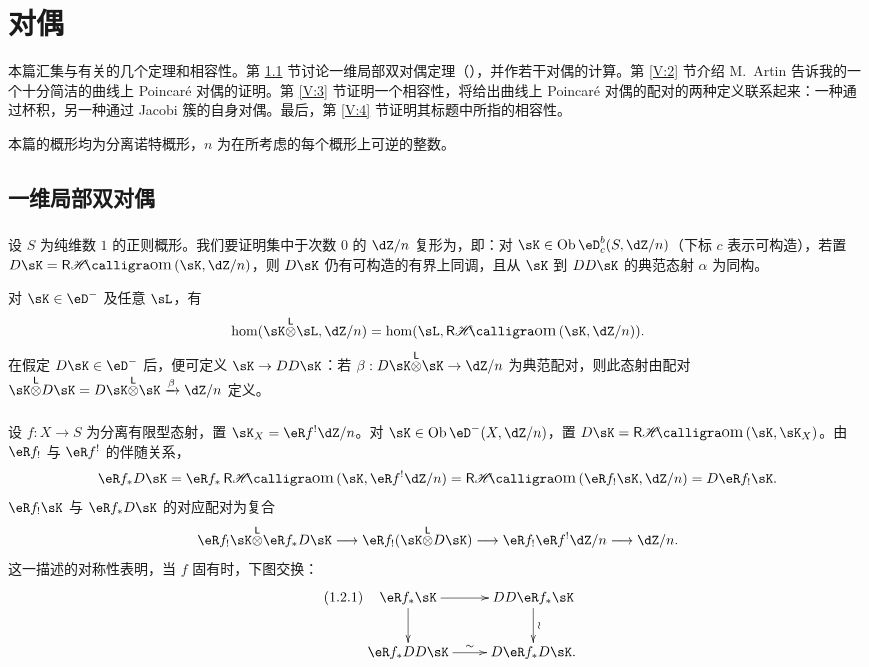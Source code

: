 \chapter{对偶}\label{V}
本篇汇集与有关的几个定理和相容性。第 \ref{V:1} 节讨论一维局部双对偶定理（\cite[I 5.1]{sga5}），并作若干对偶的计算。第 \ref{V:2} 节介绍 M.\ Artin 告诉我的一个十分简洁的曲线上 Poincaré 对偶的证明。第 \ref{V:3} 节证明一个相容性，将给出曲线上 Poincaré 对偶的配对的两种定义联系起来：一种通过杯积，另一种通过 Jacobi 簇的自身对偶。最后，第 \ref{V:4} 节证明其标题中所指的相容性。

本篇的概形均为分离诺特概形，$n$ 为在所考虑的每个概形上可逆的整数。

\section{一维局部双对偶}\label{V:1}
\subsection{}\label{V:1-1}
设 $S$ 为纯维数 $1$ 的正则概形。我们要证明集中于次数 $0$ 的 $\dZ/n$ 复形为，即：对 $\sK\in\ob\eD_c^b(S,\dZ/n)$（下标 $c$ 表示可构造），若置 $D\sK=\rHom(\sK,\dZ/n)$，则 $D\sK$ 仍有可构造的有界上同调，且从 $\sK$ 到 $DD\sK$ 的典范态射 $\alpha$ 为同构。

对 $\sK\in\eD^-$ 及任意 $\sL$，有
\[
\hom(\sK\lotimes\sL,\dZ/n)=\hom(\sL,\rHom(\sK,\dZ/n)).
\]
在假定 $D\sK\in\eD^-$ 后，便可定义 $\sK\to DD\sK$：若 $\beta:D\sK\lotimes\sK\to\dZ/n$ 为典范配对，则此态射由配对
$\sK\lotimes D\sK=D\sK\lotimes\sK\xrightarrow\beta\dZ/n$ 定义。

\subsection{}\label{V:1-2}
设 $f:X\to S$ 为分离有限型态射，置 $\sK_X=\eR f^!\dZ/n$。对 $\sK\in\ob\eD^-(X,\dZ/n)$，置 $D\sK=\rHom(\sK,\sK_X)$。由 $\eR f_!$ 与 $\eR f^!$ 的伴随关系，
\[
\eR f_*D\sK=\eR f_*\rHom(\sK,\eR f^!\dZ/n)
=\rHom(\eR f_!\sK,\dZ/n)=D\eR f_!\sK.
\]
$\eR f_!\sK$ 与 $\eR f_*D\sK$ 的对应配对为复合
\[
\eR f_!\sK\lotimes\eR f_*D\sK\longrightarrow\eR f_!(\sK\lotimes D\sK)
\longrightarrow\eR f_!\eR f^!\dZ/n\longrightarrow\dZ/n.
\]
这一描述的对称性表明，当 $f$ 固有时，下图交换：
\begin{equation*}\tag{1.2.1}\label{V:eq:1-2-1}
\xymatrix{\eR f_*\sK\ar[r]\ar[d]&DD\eR f_*\sK\ar[d]^-\wr\\
\eR f_*DD\sK\ar[r]^-\sim&D\eR f_*D\sK.}
\end{equation*}

